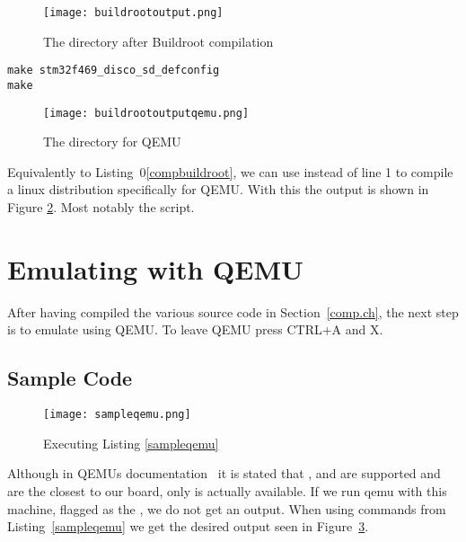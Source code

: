 \begin{figure}[H]
\centering
\texttt{[image: buildrootoutput.png]}
\caption{The  directory after Buildroot compilation}
\label{buildrootoutput}
\end{figure}

\begin{lstlisting}[style=SH, caption=Compiling commands used in Buildroot directory, label=compbuildroot]
make stm32f469_disco_sd_defconfig
make
\end{lstlisting}

\begin{figure}[H]
\centering
\texttt{[image: buildrootoutputqemu.png]}
\caption{The  directory for QEMU}
\label{buildrootoutputqemu}
\end{figure}

Equivalently to Listing~0\ref{compbuildroot}, we can use  instead of line 1 to compile a linux distribution specifically for QEMU. With this  the output is shown in Figure \ref{buildrootoutputqemu}. Most notably the  script.


\section{Emulating with QEMU}
After having compiled the various source code in Section~\ref{comp.ch}, the next step is to emulate using QEMU. To leave QEMU press CTRL+A and X.

\subsection{Sample Code}

\begin{figure}[H]
\centering
\texttt{[image: sampleqemu.png]}
\caption{Executing Listing \ref{sampleqemu}}
\label{fig:sampleqemu}
\end{figure}

Although in QEMUs documentation~\cite{qemuarm} it is stated that ,  and  are supported and are the closest to our board, only  is actually available. If we run qemu with this machine, flagged as the , we do not get an output. When using commands from Listing~\ref{sampleqemu} we get the desired output seen in Figure~\ref{fig:sampleqemu}.

